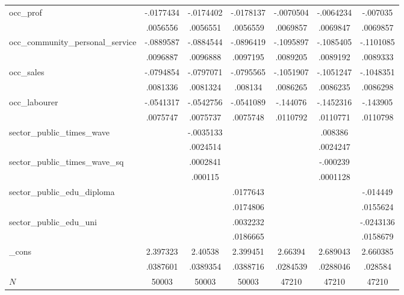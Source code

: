 {\begin{tabular}{l*{6}{c}}
occ\_prof    &   -.0177434&   -.0174402&   -.0178137&   -.0070504&   -.0064234&    -.007035\\
            &    .0056556&    .0056551&    .0056559&    .0069857&    .0069847&    .0069857\\
occ\_community\_personal\_service&   -.0889587&   -.0884544&   -.0896419&   -.1095897&   -.1085405&   -.1101085\\
            &    .0096887&    .0096888&    .0097195&    .0089205&    .0089192&    .0089333\\
occ\_sales   &   -.0794854&   -.0797071&   -.0795565&   -.1051907&   -.1051247&   -.1048351\\
            &    .0081336&    .0081324&     .008134&    .0086265&    .0086235&    .0086298\\
occ\_labourer&   -.0541317&   -.0542756&   -.0541089&    -.144076&   -.1452316&    -.143905\\
            &    .0075747&    .0075737&    .0075748&    .0110792&    .0110771&    .0110798\\
sector\_public\_times\_wave&            &   -.0035133&            &            &     .008386&            \\
            &            &    .0024514&            &            &    .0024247&            \\
sector\_public\_times\_wave\_sq&            &    .0002841&            &            &    -.000239&            \\
            &            &     .000115&            &            &    .0001128&            \\
sector\_public\_edu\_diploma&            &            &    .0177643&            &            &    -.014449\\
            &            &            &    .0174806&            &            &    .0155624\\
sector\_public\_edu\_uni&            &            &    .0032232&            &            &   -.0243136\\
            &            &            &    .0186665&            &            &    .0158679\\
\_cons      &    2.397323&     2.40538&    2.399451&     2.66394&    2.689043&    2.660385\\
            &    .0387601&    .0389354&    .0388716&    .0284539&    .0288046&     .028584\\
\hline
\(N\)       &       50003&       50003&       50003&       47210&       47210&       47210\\
\hline\hline
\end{tabular}
}
